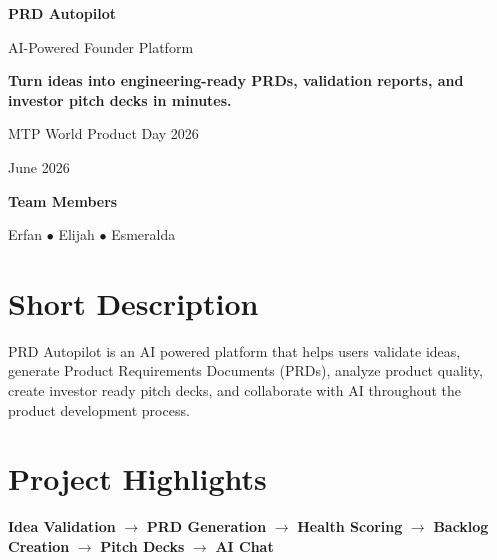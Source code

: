 \documentclass[11pt]{article}
\begin{document}
\begin{titlepage}
    \centering
    \vspace*{2cm}

    {\Huge\bfseries PRD Autopilot\par}
    \vspace{0.5cm}
    {\Large\color{primary} AI-Powered Founder Platform\par}

    \vspace{1cm}

    \begin{tcolorbox}[
        colback=light,
        colframe=primary,
        width=0.85\textwidth,
        arc=4mm,
        boxrule=0.8pt
    ]
    \centering
    \textbf{Turn ideas into engineering-ready PRDs, validation reports, and investor pitch decks in minutes.}
    \end{tcolorbox}

    \vspace{1.5cm}

    {\large MTP World Product Day 2026\par}
    \vspace{0.3cm}
    {\large June 2026\par}

    \vfill

    {\large\bfseries Team Members\par}
    \vspace{0.3cm}
    Erfan \quad $\bullet$ \quad Elijah \quad $\bullet$ \quad Esmeralda

    \vspace{1cm}
\end{titlepage}

\section{Short Description}

PRD Autopilot is an AI powered platform that helps users validate ideas, generate Product Requirements Documents (PRDs), analyze product quality, create investor ready pitch decks, and collaborate with AI throughout the product development process.

\section{Project Highlights}

\begin{tcolorbox}[
    colback=light,
    colframe=secondary,
    arc=3mm,
    boxrule=0.8pt
]
\centering
\textbf{Idea Validation}
$\rightarrow$
\textbf{PRD Generation}
$\rightarrow$
\textbf{Health Scoring}
$\rightarrow$
\textbf{Backlog Creation}
$\rightarrow$
\textbf{Pitch Decks}
$\rightarrow$
\textbf{AI Chat}
\end{tcolorbox}
\end{document}
